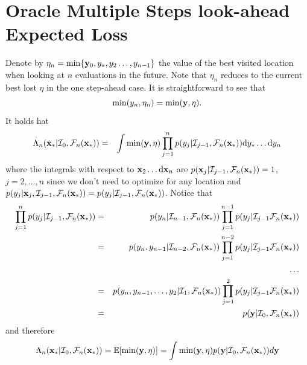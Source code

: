 \documentclass[twoside]{article}
\newcommand{\I}{\mathcal{I}}
\newcommand{\ud}{\mathrm{d}}
\newcommand{\E}{\mathbb{E}}
\newcommand{\future}{\mathcal{F}}
\begin{document}

\vspace{1cm}



\section{Oracle Multiple Steps look-ahead Expected Loss }
Denote by $\eta_n = \min \{\mathbf{y}_0, y_*, y_2\dots,y_{n-1}\}$ the value of the best visited location when looking at $n$ evaluations in the future. Note that $\eta_n$ reduces to the current best lost $\eta$ in the one step-ahead case. It is straightforward to see that 
$$ \min (y_n,\eta_n) = \min (\mathbf{y},\eta ).$$
It holds hat
\begin{eqnarray}\nonumber
\Lambda_n(\latentVector_*|\I_0, \future_{n}(\latentVector_*)) & = & \int \min (\dataVector,\eta) \prod_{j=1}^{n}p(y_{j}|\I_{j-1}, \future_{n}(\latentVector_*)) \ud y_*\dots \ud y_n
\end{eqnarray}
where the integrals with respect to $\latentVector_2\dots \ud\latentVector_n$ are  $p(\latentVector_{j}|\I_{j-1}, \future_{n}(\latentVector_*))=1$, $j=2,\dots,n$ since we don't need to optimize for any location and $p(y_{j}|\latentVector_{j},\I_{j-1}, \future_{n}(\latentVector_*))=p(y_{j}|\I_{j-1}, \future_{n}(\latentVector_*))$. Notice that
\begin{eqnarray}\nonumber
\prod_{j=1}^{n}p(y_{j}|\I_{j-1}, \future_{n}(\latentVector_*))& =& p(y_n|\I_{n-1}, \future_{n}(\latentVector_*)) \prod_{j=1}^{n-1}p(y_{j}|\I_{j-1} \future_{n}(\latentVector_*))\\\nonumber
& = & p(y_n,y_{n-1}|\I_{n-2}, \future_{n}(\latentVector_*))  \prod_{j=1}^{n-2}p(y_{j}|\I_{j-1} \future_{n}(\latentVector_*))\\\nonumber
& & \dots \\\nonumber
& = & p(y_n,y_{n-1},\dots,y_2|\I_{1}, \future_{n}(\latentVector_*))\prod_{j=1}^{2}p(y_{j}|\I_{j-1} \future_{n}(\latentVector_*))\\\nonumber
& = & p(\dataVector|\I_{0}, \future_{n}(\latentVector_*)) \nonumber
\end{eqnarray}
and therefore 
$$ \Lambda_n(\latentVector_*|\I_0, \future_{n}(\latentVector_*)) =\E [\min (\dataVector,\eta)] =\int \min (\dataVector,\eta)p(\dataVector|\I_{0}, \future_{n}(\latentVector_*))d\dataVector  $$
\end{document}
